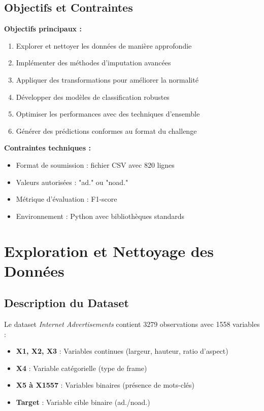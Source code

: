 \documentclass[12pt,a4paper]{article}
\begin{document}
\subsection{Objectifs et Contraintes}

\textbf{Objectifs principaux :}
\begin{enumerate}
    \item Explorer et nettoyer les données de manière approfondie
    \item Implémenter des méthodes d'imputation avancées
    \item Appliquer des transformations pour améliorer la normalité
    \item Développer des modèles de classification robustes
    \item Optimiser les performances avec des techniques d'ensemble
    \item Générer des prédictions conformes au format du challenge
\end{enumerate}

\textbf{Contraintes techniques :}
\begin{itemize}
    \item Format de soumission : fichier CSV avec 820 lignes
    \item Valeurs autorisées : "ad." ou "noad."
    \item Métrique d'évaluation : F1-score
    \item Environnement : Python avec bibliothèques standards
\end{itemize}

\section{Exploration et Nettoyage des Données}

\subsection{Description du Dataset}

Le dataset \textit{Internet Advertisements} contient 3279 observations avec 1558 variables :
\begin{itemize}
    \item \textbf{X1, X2, X3} : Variables continues (largeur, hauteur, ratio d'aspect)
    \item \textbf{X4} : Variable catégorielle (type de frame)
    \item \textbf{X5 à X1557} : Variables binaires (présence de mots-clés)
    \item \textbf{Target} : Variable cible binaire (ad./noad.)
\end{itemize}
\end{document}
